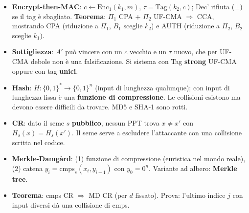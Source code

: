 \begin{itemize}
  \item \textbf{Encrypt-then-MAC}: \(c \leftarrow \text{Enc}_1(k_1, m)\), \(\tau = \text{Tag}(k_2, c)\); Dec' rifiuta (\(\bot\)) se il tag è sbagliato. \textbf{Teorema}: \(\Pi_1\) CPA + \(\Pi_2\) UF-CMA \(\Rightarrow\) CCA, mostrando CPA (riduzione a \(\Pi_1\), \(B_1\) sceglie \(k_2\)) e AUTH (riduzione a \(\Pi_2\), \(B_2\) sceglie \(k_1\)).
  \item \textbf{Sottigliezza}: \(A'\) può vincere con un \(c\) vecchio e un \(\tau\) nuovo, che per UF-CMA debole non è una falsificazione. Si sistema con Tag \textbf{strong} UF-CMA oppure con tag \textbf{unici}.
  \item \textbf{Hash}: \(H : \{0,1\}^* \to \{0,1\}^n\) (input di lunghezza qualunque); con input di lunghezza fissa è una \textbf{funzione di compressione}. Le collisioni esistono ma devono essere difficili da trovare. MD5 e SHA-1 sono rotti.
  \item \textbf{CR}: dato il seme \(s\) \textbf{pubblico}, nessun PPT trova \(x \ne x'\) con \(H_s(x) = H_s(x')\). Il seme serve a escludere l'attaccante con una collisione scritta nel codice.
  \item \textbf{Merkle-Damgård}: (1) funzione di compressione (euristica nel mondo reale), (2) catena \(y_i = \text{cmps}_s(x_i, y_{i-1})\) con \(y_0 = 0^n\). Variante ad albero: \textbf{Merkle tree}.
  \item \textbf{Teorema}: cmps CR \(\Rightarrow\) MD CR (per \(d\) fissato). Prova: l'ultimo indice \(j\) con input diversi dà una collisione di cmps.
\end{itemize}
